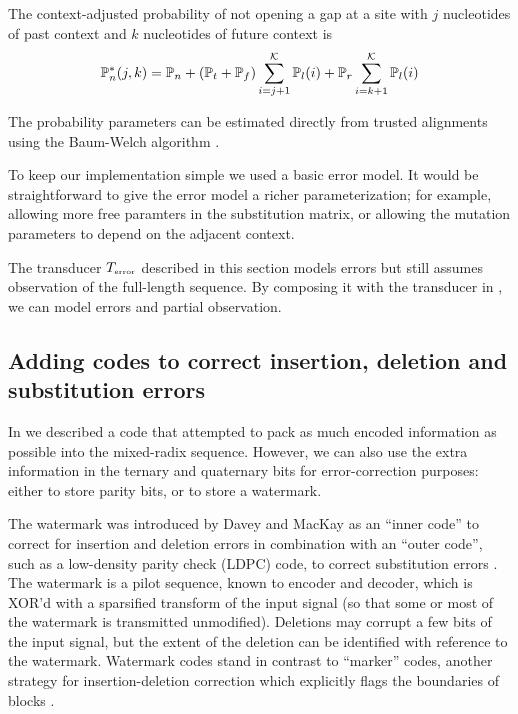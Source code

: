 \documentclass[english]{article}
\begin{document}
The context-adjusted probability of not opening a gap at a site with $j$ nucleotides of past context and $k$ nucleotides of future context is
\[
\mathbb{P}_{n}^\ast(j,k) = \mathbb{P}_{n} + (\mathbb{P}_{t} + \mathbb{P}_{f}) \sum_{i=j+1}^{{\cal K}} \mathbb{P}_{l}(i) + \mathbb{P}_{r} \sum_{i=k+1}^{{\cal K}} \mathbb{P}_{l}(i)
\]

The probability parameters can be estimated directly from trusted alignments using the Baum-Welch algorithm \cite{Durbin98}.

To keep our implementation simple we used a basic error model.
It would be straightforward to give the error model a richer parameterization;
for example, allowing more free paramters in the substitution matrix,
or allowing the mutation parameters to depend on the adjacent context.

The transducer $T_{\mbox{\tiny error}}$
described in this section models errors but still assumes observation of the full-length sequence.
By composing it with the transducer in , we can model errors and partial observation.

\subsection{Adding codes to correct insertion, deletion and substitution errors}

In  we described a code that attempted to pack as much encoded information as possible into the mixed-radix sequence.
However, we can also use the extra information in the ternary and quaternary bits for error-correction purposes:
either to store parity bits, or to store a watermark.

The watermark was introduced by Davey and MacKay as an ``inner code'' to correct for insertion and deletion errors
in combination with an ``outer code'', such as a low-density parity check (LDPC) code, to correct substitution errors \cite{DaveyMackay2000,DaveyMackay2001}.
The watermark is a pilot sequence, known to encoder and decoder, which is XOR'd with a sparsified transform of the input signal
(so that some or most of the watermark is transmitted unmodified).
Deletions may corrupt a few bits of the input signal, but the extent of the deletion can be identified with reference to the watermark.
Watermark codes stand in contrast to ``marker'' codes, another strategy for insertion-deletion correction which explicitly flags the boundaries of blocks \cite{RatzerMackay2000}.
\end{document}
